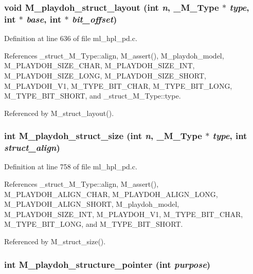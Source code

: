 \subsubsection{\setlength{\rightskip}{0pt plus 5cm}void M\_\-playdoh\_\-struct\_\-layout (int {\em n}, \bf{\_\-M\_\-Type} $\ast$ {\em type}, int $\ast$ {\em base}, int $\ast$ {\em bit\_\-offset})}\label{ml__hpl__pd_8c_f828cbba402137fa0a4b87a204b67723}




Definition at line 636 of file ml\_\-hpl\_\-pd.c.

References \_\-struct\_\-M\_\-Type::align, M\_\-assert(), M\_\-playdoh\_\-model, M\_\-PLAYDOH\_\-SIZE\_\-CHAR, M\_\-PLAYDOH\_\-SIZE\_\-INT, M\_\-PLAYDOH\_\-SIZE\_\-LONG, M\_\-PLAYDOH\_\-SIZE\_\-SHORT, M\_\-PLAYDOH\_\-V1, M\_\-TYPE\_\-BIT\_\-CHAR, M\_\-TYPE\_\-BIT\_\-LONG, M\_\-TYPE\_\-BIT\_\-SHORT, and \_\-struct\_\-M\_\-Type::type.

Referenced by M\_\-struct\_\-layout().
\subsubsection{\setlength{\rightskip}{0pt plus 5cm}int M\_\-playdoh\_\-struct\_\-size (int {\em n}, \bf{\_\-M\_\-Type} $\ast$ {\em type}, int {\em struct\_\-align})}\label{ml__hpl__pd_8c_4958ab51908dc3657789fc7d1b17a53d}




Definition at line 758 of file ml\_\-hpl\_\-pd.c.

References \_\-struct\_\-M\_\-Type::align, M\_\-assert(), M\_\-PLAYDOH\_\-ALIGN\_\-CHAR, M\_\-PLAYDOH\_\-ALIGN\_\-LONG, M\_\-PLAYDOH\_\-ALIGN\_\-SHORT, M\_\-playdoh\_\-model, M\_\-PLAYDOH\_\-SIZE\_\-INT, M\_\-PLAYDOH\_\-V1, M\_\-TYPE\_\-BIT\_\-CHAR, M\_\-TYPE\_\-BIT\_\-LONG, and M\_\-TYPE\_\-BIT\_\-SHORT.

Referenced by M\_\-struct\_\-size().
\subsubsection{\setlength{\rightskip}{0pt plus 5cm}int M\_\-playdoh\_\-structure\_\-pointer (int {\em purpose})}\label{ml__hpl__pd_8c_079bbbce47aaeafb64d6cf9d660995ef}




